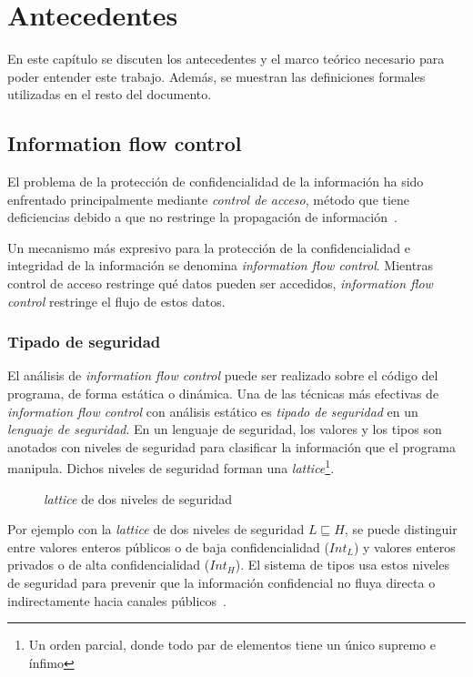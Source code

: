 \chapter{Antecedentes}

En este capítulo se discuten los antecedentes y el marco teórico necesario para poder entender este trabajo. Además, se muestran las definiciones formales utilizadas en el resto del documento.

\section{Information flow control}

	El problema de la protección de confidencialidad de la información ha sido enfrentado principalmente mediante \textit{control de acceso}, método que tiene deficiencias debido a que no restringe la propagación de información~\cite{myers-phd}.

	Un mecanismo más expresivo para la protección de la confidencialidad e integridad de la información se denomina \textit{information flow control}. Mientras control de acceso restringe qué datos pueden ser accedidos, \textit{information flow control} restringe el flujo de estos datos.

	\subsection{Tipado de seguridad}
	El análisis de \textit{information flow control} puede ser realizado sobre el código del programa, de forma estática o dinámica. Una de las técnicas más efectivas de \textit{information flow control} con análisis estático es \textit{tipado de seguridad} en un \textit{lenguaje de seguridad}. En un lenguaje de seguridad, los valores y los tipos son anotados con niveles de seguridad para clasificar la información que el programa manipula. Dichos niveles de seguridad forman una \textit{lattice}\footnote{Un orden parcial, donde todo par de elementos tiene un único supremo e ínfimo}.

	\begin{figure}[ht]
		\centering
		\caption{\textit{lattice} de dos niveles de seguridad}
	\end{figure}


	Por ejemplo con la \textit{lattice} de dos niveles de seguridad $L \sqsubseteq H$, se puede distinguir entre valores enteros públicos o de baja confidencialidad ($Int_L$) y valores enteros privados o de alta confidencialidad ($Int_H$). El sistema de tipos usa estos niveles de seguridad para prevenir que la información confidencial no fluya directa o indirectamente hacia canales públicos~\cite{volpanoAl:S96}. %

